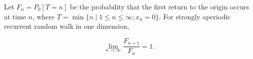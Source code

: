 Let $F_n = P_0[T = n]$ be the probability that the first return to the origin occurs at time $n$, where $T = \min\{n \mid 1 \leq n \leq \infty; x_n = 0\}$. For strongly aperiodic recurrent random walk in one dimension,

$$\lim_{n \to \infty} \frac{F_{n+1}}{F_n} = 1.$$
